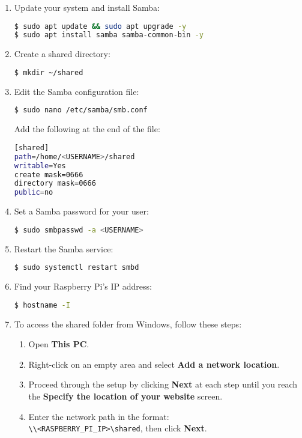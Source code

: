 \begin{enumerate}
\item Update your system and install Samba:
\begin{lstlisting}[language=bash, breaklines=true, breakatwhitespace=true, columns=fullflexible]
$ sudo apt update && sudo apt upgrade -y
$ sudo apt install samba samba-common-bin -y
\end{lstlisting}

\item Create a shared directory:
\begin{lstlisting}[language=bash, breaklines=true, breakatwhitespace=true, columns=fullflexible]
$ mkdir ~/shared
\end{lstlisting}

\item Edit the Samba configuration file:
\begin{lstlisting}[language=bash, breaklines=true, breakatwhitespace=true, columns=fullflexible]
$ sudo nano /etc/samba/smb.conf
\end{lstlisting}
Add the following at the end of the file:
\begin{lstlisting}[language=bash, breaklines=true, breakatwhitespace=true, columns=fullflexible]
[shared]
path=/home/<USERNAME>/shared
writable=Yes
create mask=0666
directory mask=0666
public=no
\end{lstlisting}

\item Set a Samba password for your user:
\begin{lstlisting}[language=bash, breaklines=true, breakatwhitespace=true, columns=fullflexible]
$ sudo smbpasswd -a <USERNAME>
\end{lstlisting}

\item Restart the Samba service:
\begin{lstlisting}[language=bash, breaklines=true, breakatwhitespace=true, columns=fullflexible]
$ sudo systemctl restart smbd
\end{lstlisting}

\item Find your Raspberry Pi's IP address:
\begin{lstlisting}[language=bash, breaklines=true, breakatwhitespace=true, columns=fullflexible]
$ hostname -I
\end{lstlisting}

\item To access the shared folder from Windows, follow these steps:
\begin{enumerate}
\item Open \textbf{This PC}.
\item Right-click on an empty area and select \textbf{Add a network location}.
\item Proceed through the setup by clicking \textbf{Next} at each step until you reach the \textbf{Specify the location of your website} screen.
\item Enter the network path in the format: \texttt{\\\textbackslash\textbackslash<RASPBERRY\_PI\_IP>\textbackslash shared}, then click \textbf{Next}.
\end{enumerate}


\end{enumerate}